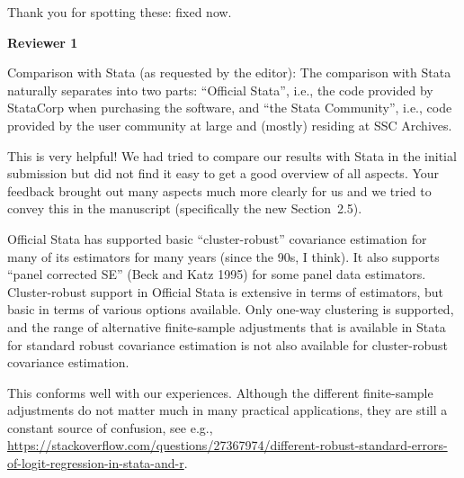 \documentclass[american,foldmarks=false]{uibklttr}
\newenvironment{review}{\fontshape{\itdefault}\fontseries{\bfdefault} \selectfont \smallskip}{\par}
\begin{document}
Thank you for spotting these: fixed now.


\newpage


\textbf{\LARGE Reviewer 1}

\begin{review}
Comparison with Stata (as requested by the editor):
%
The comparison with Stata naturally separates into two parts: ``Official
Stata'', i.e., the code provided by StataCorp when purchasing the software, and
``the Stata Community'', i.e., code provided by the user community at large and
(mostly) residing at SSC Archives.
\end{review}

This is very helpful! We had tried to compare our results with Stata in the
initial submission but did not find it easy to get a good overview of all
aspects. Your feedback brought out many aspects much more clearly for us and
we tried to convey this in the manuscript (specifically the new Section~2.5).


\begin{review}
Official Stata has supported basic ``cluster-robust'' covariance estimation for
many of its estimators for many years (since the 90s, I think).  It also
supports ``panel corrected SE'' (Beck and Katz 1995) for some panel data
estimators.  Cluster-robust support in Official Stata is extensive in terms of
estimators, but basic in terms of various options available.  Only one-way
clustering is supported, and the range of alternative finite-sample adjustments
that is available in Stata for standard robust covariance estimation is not also
available for cluster-robust covariance estimation.
\end{review}

This conforms well with our experiences. Although the different finite-sample
adjustments do not matter much in many practical applications, they are still
a constant source of confusion, see e.g.,
\url{https://stackoverflow.com/questions/27367974/different-robust-standard-errors-of-logit-regression-in-stata-and-r}.
\end{document}
